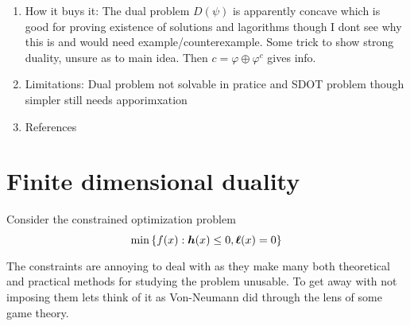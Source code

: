 \documentclass[
    a4paper,
    DIV=13,
    abstract=true,
    numbers=noenddot
]{scrartcl}
\begin{document}
\begin{enumerate}
\begin{enumerate}
      \end{enumerate}
    \item How it buys it: The dual problem $D(\psi)$ is apparently concave which is good for proving existence of solutions and lagorithms \cite[Section 7]{levy2017notionsoptimaltransporttheory} though I dont see why this is and would need example/counterexample. Some trick to show strong duality, unsure as to main idea. Then $c= \varphi\oplus \varphi^c$ gives info.
    \item Limitations: Dual problem not solvable in pratice and SDOT problem though simpler still needs apporimxation
    \item References
\end{enumerate}


\section{Finite dimensional duality}
Consider the constrained optimization problem 
\begin{align*}
  \min_{} \left\{f(x): {\bm{h}}(x) \le 0, {\bm{\ell }}(x)=0\right\}
\end{align*}
The constraints are annoying to deal with as they make many both theoretical and practical methods for studying the problem unusable. To get away with not imposing them lets think of it as Von-Neumann did through the lens of some game theory.
\end{document}
